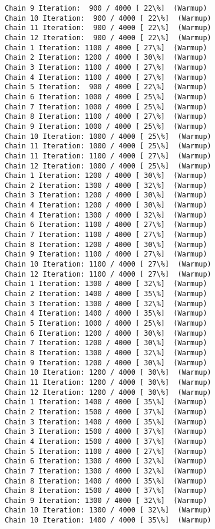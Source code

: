 \documentclass[11pt]{article}
\begin{document}
\begin{Verbatim}[commandchars=\\\{\}]
Chain 9 Iteration:  900 / 4000 [ 22\%]  (Warmup)
Chain 10 Iteration:  900 / 4000 [ 22\%]  (Warmup)
Chain 11 Iteration:  900 / 4000 [ 22\%]  (Warmup)
Chain 12 Iteration:  900 / 4000 [ 22\%]  (Warmup)
Chain 1 Iteration: 1100 / 4000 [ 27\%]  (Warmup)
Chain 2 Iteration: 1200 / 4000 [ 30\%]  (Warmup)
Chain 3 Iteration: 1100 / 4000 [ 27\%]  (Warmup)
Chain 4 Iteration: 1100 / 4000 [ 27\%]  (Warmup)
Chain 5 Iteration:  900 / 4000 [ 22\%]  (Warmup)
Chain 6 Iteration: 1000 / 4000 [ 25\%]  (Warmup)
Chain 7 Iteration: 1000 / 4000 [ 25\%]  (Warmup)
Chain 8 Iteration: 1100 / 4000 [ 27\%]  (Warmup)
Chain 9 Iteration: 1000 / 4000 [ 25\%]  (Warmup)
Chain 10 Iteration: 1000 / 4000 [ 25\%]  (Warmup)
Chain 11 Iteration: 1000 / 4000 [ 25\%]  (Warmup)
Chain 11 Iteration: 1100 / 4000 [ 27\%]  (Warmup)
Chain 12 Iteration: 1000 / 4000 [ 25\%]  (Warmup)
Chain 1 Iteration: 1200 / 4000 [ 30\%]  (Warmup)
Chain 2 Iteration: 1300 / 4000 [ 32\%]  (Warmup)
Chain 3 Iteration: 1200 / 4000 [ 30\%]  (Warmup)
Chain 4 Iteration: 1200 / 4000 [ 30\%]  (Warmup)
Chain 4 Iteration: 1300 / 4000 [ 32\%]  (Warmup)
Chain 6 Iteration: 1100 / 4000 [ 27\%]  (Warmup)
Chain 7 Iteration: 1100 / 4000 [ 27\%]  (Warmup)
Chain 8 Iteration: 1200 / 4000 [ 30\%]  (Warmup)
Chain 9 Iteration: 1100 / 4000 [ 27\%]  (Warmup)
Chain 10 Iteration: 1100 / 4000 [ 27\%]  (Warmup)
Chain 12 Iteration: 1100 / 4000 [ 27\%]  (Warmup)
Chain 1 Iteration: 1300 / 4000 [ 32\%]  (Warmup)
Chain 2 Iteration: 1400 / 4000 [ 35\%]  (Warmup)
Chain 3 Iteration: 1300 / 4000 [ 32\%]  (Warmup)
Chain 4 Iteration: 1400 / 4000 [ 35\%]  (Warmup)
Chain 5 Iteration: 1000 / 4000 [ 25\%]  (Warmup)
Chain 6 Iteration: 1200 / 4000 [ 30\%]  (Warmup)
Chain 7 Iteration: 1200 / 4000 [ 30\%]  (Warmup)
Chain 8 Iteration: 1300 / 4000 [ 32\%]  (Warmup)
Chain 9 Iteration: 1200 / 4000 [ 30\%]  (Warmup)
Chain 10 Iteration: 1200 / 4000 [ 30\%]  (Warmup)
Chain 11 Iteration: 1200 / 4000 [ 30\%]  (Warmup)
Chain 12 Iteration: 1200 / 4000 [ 30\%]  (Warmup)
Chain 1 Iteration: 1400 / 4000 [ 35\%]  (Warmup)
Chain 2 Iteration: 1500 / 4000 [ 37\%]  (Warmup)
Chain 3 Iteration: 1400 / 4000 [ 35\%]  (Warmup)
Chain 3 Iteration: 1500 / 4000 [ 37\%]  (Warmup)
Chain 4 Iteration: 1500 / 4000 [ 37\%]  (Warmup)
Chain 5 Iteration: 1100 / 4000 [ 27\%]  (Warmup)
Chain 6 Iteration: 1300 / 4000 [ 32\%]  (Warmup)
Chain 7 Iteration: 1300 / 4000 [ 32\%]  (Warmup)
Chain 8 Iteration: 1400 / 4000 [ 35\%]  (Warmup)
Chain 8 Iteration: 1500 / 4000 [ 37\%]  (Warmup)
Chain 9 Iteration: 1300 / 4000 [ 32\%]  (Warmup)
Chain 10 Iteration: 1300 / 4000 [ 32\%]  (Warmup)
Chain 10 Iteration: 1400 / 4000 [ 35\%]  (Warmup)

\end{Verbatim}
\end{document}
